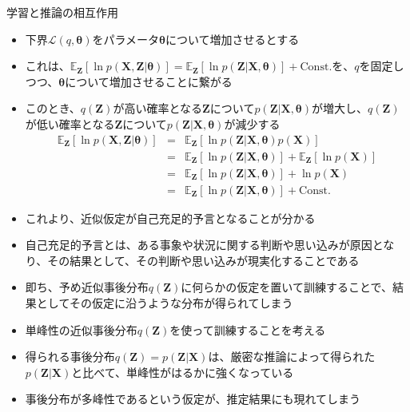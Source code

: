 \documentclass[dvipdfmx,notheorems,t]{beamer}
\begin{document}
\begin{frame}{学習と推論の相互作用}
\begin{itemize}
\begin{itemize}
		\item 下界$\mathcal{L}(q, \bm{\theta})$を\color{red}パラメータ$\bm{\theta}$について\normalcolor 増加させるとする
		\item これは、$\mathbb{E}_{\bm{Z}} \left[ \ln p(\bm{X}, \bm{Z} | \bm{\theta}) \right] = \mathbb{E}_{\bm{Z}} \left[ \ln p(\bm{Z} | \bm{X}, \bm{\theta}) \right] + \mathrm{Const.}$を、\color{red}$q$を固定しつつ\normalcolor 、$\bm{\theta}$について増加させることに繋がる
		\newline
		\item このとき、$q(\bm{Z})$が高い確率となる$\bm{Z}$について$p(\bm{Z} | \bm{X}, \bm{\theta})$が増大し、$q(\bm{Z})$が低い確率となる$\bm{Z}$について$p(\bm{Z} | \bm{X}, \bm{\theta})$が減少する
		\begin{eqnarray}
			\mathbb{E}_{\bm{Z}} \left[ \ln p(\bm{X}, \bm{Z} | \bm{\theta}) \right] &=& \mathbb{E}_{\bm{Z}} \left[ \ln p(\bm{Z} | \bm{X}, \bm{\theta}) p(\bm{X}) \right] \nonumber \\
			&=& \mathbb{E}_{\bm{Z}} \left[ \ln p(\bm{Z} | \bm{X}, \bm{\theta}) \right] + \mathbb{E}_{\bm{Z}} \left[ \ln p(\bm{X}) \right] \nonumber \\
			&=& \mathbb{E}_{\bm{Z}} \left[ \ln p(\bm{Z} | \bm{X}, \bm{\theta}) \right] + \ln p(\bm{X}) \nonumber \\
			&=& \mathbb{E}_{\bm{Z}} \left[ \ln p(\bm{Z} | \bm{X}, \bm{\theta}) \right] + \mathrm{Const.}
		\end{eqnarray}
		
		\item これより、近似仮定が\alert{自己充足的予言}となることが分かる
		\item 自己充足的予言とは、ある事象や状況に関する判断や思い込みが原因となり、その結果として、その判断や思い込みが現実化することである
		\newline
		
		\item 即ち、予め近似事後分布$q(\bm{Z})$に何らかの仮定を置いて訓練することで、\color{red}結果としてその仮定に沿うような\normalcolor 分布が得られてしまう
		\newline
		
		\item 単峰性の近似事後分布$q(\bm{Z})$を使って訓練することを考える
		\item 得られる事後分布$q(\bm{Z}) = p(\bm{Z} | \bm{X})$は、厳密な推論によって得られた$p(\bm{Z} | \bm{X})$と比べて、単峰性がはるかに強くなっている
		\item 事後分布が多峰性であるという仮定が、\color{red}推定結果にも現れてしまう\normalcolor
	\end{itemize} \
	

\end{itemize}
\end{frame}
\end{document}
